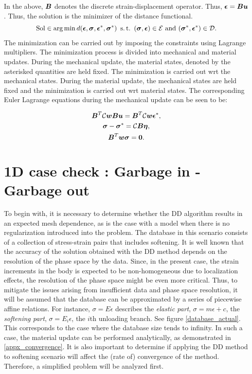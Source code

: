 \documentclass[10pt]{elsarticle}
\begin{document}
In the above, $\mbox{\boldmath $B$}$ denotes the discrete strain-displacement operator. Thus, $\mbox{\boldmath $\epsilon$} = \mbox{\boldmath $B$} \mbox{\boldmath $u$}$. Thus, the solution is the minimizer of the distance functional.
\begin{equation}
	\text{Sol} \in \arg \min d(\mbox{\boldmath $\epsilon$},\mbox{\boldmath $\sigma$},\mbox{\boldmath $\epsilon$}^*,\mbox{\boldmath $\sigma$}^*) \text{ } \operatorname{s.t.} \text{ } (\mbox{\boldmath $\sigma$} , \mbox{\boldmath $\epsilon$}) \in  \mathcal{E} \text{ and } (\mbox{\boldmath $\sigma$}^* , \mbox{\boldmath $\epsilon$}^*) \in  \mathcal{D}.
\end{equation}
The minimization can be carried out by imposing the constraints using Lagrange multipliers. The minimization process is divided into mechanical and material updates. During the mechanical update, the material states, denoted by the asterisked quantities are held fixed. The minimization is carried out wrt the mechanical states. During the material update, the mechanical states are held fixed and the minimization is carried out wrt material states.
The corresponding Euler Lagrange equations during the mechanical update can be seen to be:

\begin{gather}
	\mbox{\boldmath $B$}^T \mathcal{C}\mbox{\boldmath $w$} \mbox{\boldmath $B$} \mbox{\boldmath $u$} = \mbox{\boldmath $B$}^T \mathcal{C}\mbox{\boldmath $w$} \mbox{\boldmath $\epsilon$}^*, \\
	\mbox{\boldmath $\sigma$} - \mbox{\boldmath $\sigma$}^* =  \mathcal{C} \mbox{\boldmath $B$} \mbox{\boldmath $\eta$}, \\
	\mbox{\boldmath $B$}^T \mbox{\boldmath $w$}\mbox{\boldmath $\sigma$} = \mathbf{0}.
\end{gather}

\section{1D case check : Garbage in - Garbage out}
To begin with, it is necessary to determine whether the DD algorithm results in an expected mesh dependence, as is the case with a model when there is no regularization introduced into the problem. The database in this scenario consists of a collection of stress-strain pairs that includes softening. It is well known that the accuracy of the solution obtained with the DD method depends on the resolution of the phase space by the data. Since, in the present case, the strain increments in the body is expected to be non-homogeneous due to localization effects, the resolution of the phase space might be even more critical. Thus, to mitigate the issues arising from insufficient data and phase space resolution, it will be assumed that the database can be approximated by a series of piecewise affine relations. For instance, $\sigma=E \epsilon$ describes the \textit{elastic part}, $\sigma = m\epsilon + c$, the \textit{softening part}, $\sigma = E_i \epsilon$, the $i$th unloading branch. See figure \ref{database_actual}. This corresponds to the case where the database size tends to infinity. In such a case, the material update can be performed analytically, as demonstrated in \ref{appx_convergence}. It is also important to determine if applying the DD method to softening scenario will affect the (rate of) convergence of the method. Therefore, a simplified problem will be analyzed first.
\end{document}
